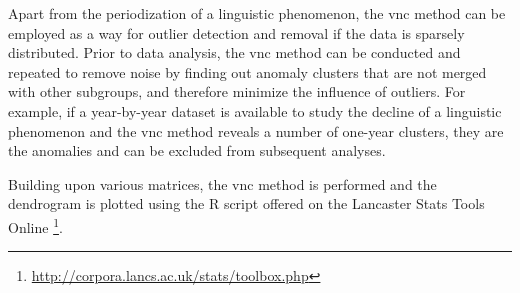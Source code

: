 Apart from the periodization of a linguistic phenomenon, the \gls{vnc} method can be employed as a way for outlier detection and removal if the data is sparsely distributed. Prior to data analysis, the \gls{vnc} method can be conducted and repeated to remove noise by finding out anomaly clusters that are not merged with other subgroups, and therefore minimize the influence of outliers. For example, if a year-by-year dataset is available to study the decline of a linguistic phenomenon and the \gls{vnc} method reveals a number of one-year clusters, they are the anomalies and can be excluded from subsequent analyses.

Building upon various matrices, the \gls{vnc} method is performed and the dendrogram is plotted using the R script offered on the Lancaster Stats Tools Online \parencite{brezina2018statistics}\footnote{\url{http://corpora.lancs.ac.uk/stats/toolbox.php}}.

